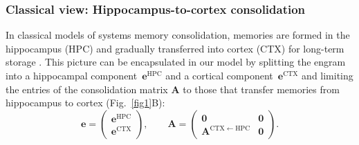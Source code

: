 \subsubsection{Classical view: Hippocampus-to-cortex consolidation}

In classical models of systems memory consolidation, memories are formed in the hippocampus (HPC) and gradually transferred into cortex (CTX) for long-term storage \citep{McClelland1995, Roxin2013}. This picture can be encapsulated in our model by splitting the engram into a hippocampal component~$\mathbf{e}^{\mathrm{HPC}}$ and a cortical component~$\mathbf{e}^{\mathrm{CTX}}$ and limiting the entries of the consolidation matrix $\mathbf{A}$ to those that transfer memories from hippocampus to cortex (Fig.~\ref{fig1}B): %
%
\begin{equation}\label{eq:engram_split}
 \mathbf{e} = \begin{pmatrix}
   \mathbf{e}^{\mathrm{HPC}} \\[1ex]
   \mathbf{e}^{\mathrm{CTX}}
 \end{pmatrix}, \qquad
  \mathbf{A} = \begin{pmatrix}
   \mathbf{0} & \mathbf{0} \\[1ex]
   \mathbf{A}^{\mathrm{CTX}\leftarrow\mathrm{HPC}} & \mathbf{0}
 \end{pmatrix}
 .
\end{equation}

